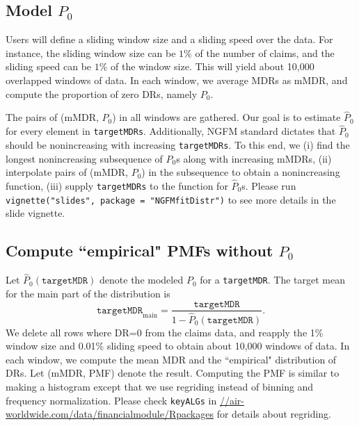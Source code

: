 \documentclass[12pt,letterpaper]{article}
\begin{document}
\subsection{Model $P_0$}

Users will define a sliding window size and a sliding speed over the data. For instance, the sliding window size can be $1\%$ of the number of claims, and the sliding speed can be $1\%$ of the window size. This will yield about 10,000 overlapped windows of data. In each window, we average MDRs as mMDR, and compute the proportion of zero DRs, namely $P_0$. 



The pairs of (mMDR, $P_0$) in all windows are gathered.
Our goal is to estimate $\hat{P}_0$ for every element in \texttt{targetMDRs}. Additionally, NGFM standard dictates that $\hat{P}_0$ should be nonincreasing with increasing \texttt{targetMDRs}. To this end, we (i) find the longest nonincreasing subsequence of $P_0$s along with increasing mMDRs, (ii) interpolate pairs of (mMDR, $P_0$) in the subsequence to obtain a nonincreasing function, (iii) supply \texttt{targetMDRs} to the function for $\hat{P}_0$s. Please run \texttt{vignette("slides", package = "NGFMfitDistr")} to see more details in the slide vignette.

\subsection{Compute ``empirical" PMFs without $P_0$}

Let $\hat{P}_0(\texttt{targetMDR})$ denote the modeled $P_0$ for a \texttt{targetMDR}. The target mean for the main part of the distribution is
\begin{equation*}
\texttt{targetMDR}_{\text{main}} = \frac{\texttt{targetMDR}}{  1 -  \hat{P}_0(\texttt{targetMDR}) }.
\end{equation*}
We delete all rows where DR=0 from the claims data, and reapply the 1\% window size and 0.01\% sliding speed to obtain about 10,000 windows of data. In each window, we compute the mean MDR and the ``empirical" distribution of DRs. Let (mMDR, PMF) denote the result. Computing the PMF is similar to making a histogram except that we use regriding instead of binning and frequency normalization. Please check \texttt{keyALGs} in \url{//air-worldwide.com/data/financialmodule/Rpackages} for details about regriding.
\end{document}

